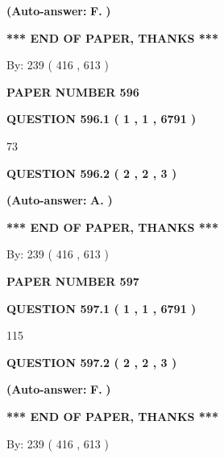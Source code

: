 \documentclass[12pt]{article}
\begin{document}
 
{\textbf{(Auto-answer:}}
{\textbf{\large{
F.}}}
{\textbf{)}}
 
 
   
   
   
   
\vspace{1.0in} 
{\textbf{\large{ *** END OF PAPER, THANKS *** }}} 
   
   
\hspace{1.0in} By: 
 239 ( 416 ,  613 )
   
   
   
   
\newpage 
\setcounter{page}{ 
   596001 } 
   
   
 {\textbf{ \Large{ PAPER NUMBER  596  }}}
   
   
   
   
  
  
{\textbf{\large{QUESTION
596.1 
 ( 1 , 1 , 6791 )
}}}

73
  
  
{\textbf{\large{QUESTION
596.2 
 ( 2 , 2 , 3 )
}}}
 
 
{\textbf{(Auto-answer:}}
{\textbf{\large{
A.}}}
{\textbf{)}}
 
 
   
   
   
   
\vspace{1.0in} 
{\textbf{\large{ *** END OF PAPER, THANKS *** }}} 
   
   
\hspace{1.0in} By: 
 239 ( 416 ,  613 )
   
   
   
   
\newpage 
\setcounter{page}{ 
   597001 } 
   
   
 {\textbf{ \Large{ PAPER NUMBER  597  }}}
   
   
   
   
  
  
{\textbf{\large{QUESTION
597.1 
 ( 1 , 1 , 6791 )
}}}

115
  
  
{\textbf{\large{QUESTION
597.2 
 ( 2 , 2 , 3 )
}}}
 
 
{\textbf{(Auto-answer:}}
{\textbf{\large{
F.}}}
{\textbf{)}}
 
 
   
   
   
   
\vspace{1.0in} 
{\textbf{\large{ *** END OF PAPER, THANKS *** }}} 
   
   
\hspace{1.0in} By: 
 239 ( 416 ,  613 )
   
   
   
\end{document}
